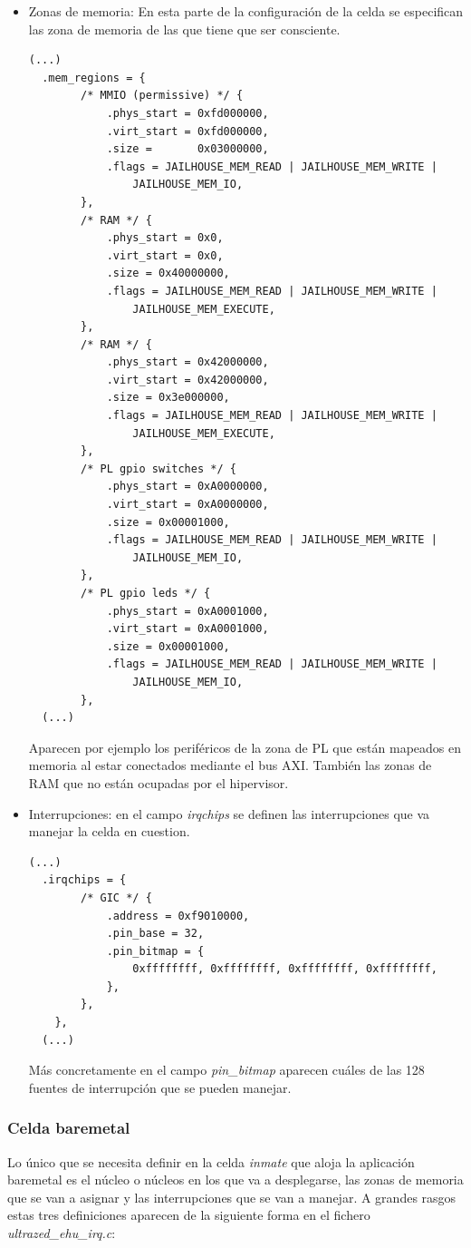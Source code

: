 \begin{itemize}
  \item Zonas de memoria: En esta parte de la configuración de la celda se especifican las zona de memoria de las que tiene que ser consciente.
  \begin{lstlisting}[style=CStyle]
  (...)
  .mem_regions = {
		/* MMIO (permissive) */ {
			.phys_start = 0xfd000000,
			.virt_start = 0xfd000000,
			.size =	      0x03000000,
			.flags = JAILHOUSE_MEM_READ | JAILHOUSE_MEM_WRITE |
				JAILHOUSE_MEM_IO,
		},
		/* RAM */ {
			.phys_start = 0x0,
			.virt_start = 0x0,
			.size = 0x40000000,
			.flags = JAILHOUSE_MEM_READ | JAILHOUSE_MEM_WRITE |
				JAILHOUSE_MEM_EXECUTE,
		},
		/* RAM */ {
			.phys_start = 0x42000000,
			.virt_start = 0x42000000,
			.size = 0x3e000000,
			.flags = JAILHOUSE_MEM_READ | JAILHOUSE_MEM_WRITE |
				JAILHOUSE_MEM_EXECUTE,
		},
		/* PL gpio switches */ {
			.phys_start = 0xA0000000,
			.virt_start = 0xA0000000,
			.size = 0x00001000,
			.flags = JAILHOUSE_MEM_READ | JAILHOUSE_MEM_WRITE |
				JAILHOUSE_MEM_IO,
		},
		/* PL gpio leds */ {
			.phys_start = 0xA0001000,
			.virt_start = 0xA0001000,
			.size = 0x00001000,
			.flags = JAILHOUSE_MEM_READ | JAILHOUSE_MEM_WRITE |
				JAILHOUSE_MEM_IO,
		},
  (...)
  \end{lstlisting}
  Aparecen por ejemplo los periféricos de la zona de \acrshort{PL} que están mapeados en memoria al estar conectados mediante el bus \acrshort{AXI}. También las zonas de \acrshort{RAM} que no están ocupadas por el hipervisor.

  \item Interrupciones: en el campo \textit{irqchips} se definen las interrupciones que va manejar la celda en cuestion.
  \begin{lstlisting}[style=CStyle]
  (...)
  .irqchips = {
		/* GIC */ {
			.address = 0xf9010000,
			.pin_base = 32,
			.pin_bitmap = {
				0xffffffff, 0xffffffff, 0xffffffff, 0xffffffff,
			},
		},
	},
  (...)
  \end{lstlisting}
  Más concretamente en el campo \textit{pin\_bitmap} aparecen cuáles de las 128 fuentes de interrupción que se pueden manejar.

\end{itemize}

\subsubsection{Celda baremetal}
Lo único que se necesita definir en la celda \textit{inmate} que aloja la aplicación baremetal es el núcleo o núcleos en los que va a desplegarse, las zonas de memoria que se van a asignar y las interrupciones que se van a manejar. A grandes rasgos estas tres definiciones aparecen de la siguiente forma en el fichero \textit{ultrazed\_ehu\_irq.c}:

